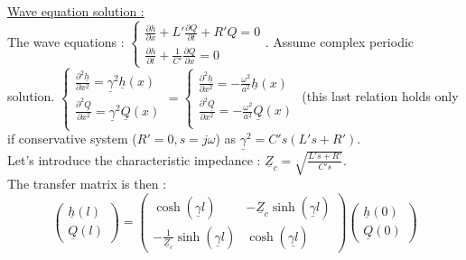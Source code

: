 \documentclass[../main.tex]{subfiles}
\begin{document}
\quad \underline{Wave equation solution :}\\

The wave equations : $\begin{cases}
    \frac{\partial h}{\partial x}+ L' \frac{\partial Q}{\partial t} + R' Q = 0\\ \frac{\partial h}{\partial t} + \frac{1}{C'} \frac{\partial Q}{\partial x} =0
\end{cases}$. Assume complex periodic solution. $\begin{cases}
    \frac{\partial^2\underline{h}}{\partial x^2} = \underline{\gamma}^2 \underline{h}(x)\\
    \frac{\partial^2\underline{Q}}{\partial x^2} = \underline{\gamma}^2 \underline{Q}(x)\\
\end{cases} = \begin{cases}
    \frac{\partial^2\underline{h}}{\partial x^2} = -\frac{\omega^2}{a^2} \underline{h}(x)\\
    \frac{\partial^2\underline{Q}}{\partial x^2} = -\frac{\omega^2}{a^2} \underline{Q}(x)\\
\end{cases}$ (this last relation holds only if conservative system ($R'=0, s=j\omega$) as $\underline{\gamma}^2 = C's(L's+R')$.\\

Let's introduce the characteristic impedance : $\underline{Z}_c = \sqrt{\frac{L's+R'}{C's}}$.\\
The transfer matrix is then : \begin{equation}
    \begin{pmatrix}
        \underline{h}(l)\\ \underline{Q}(l) 
    \end{pmatrix} = \begin{pmatrix}
        \cosh(\underline{\gamma} l) & -\underline{Z}_c \sinh(\underline{\gamma}l)\\
        -\frac{1}{\underline{Z}_c} \sinh(\underline{\gamma}l) & \cosh(\underline{\gamma l})
    \end{pmatrix} \begin{pmatrix}
        \underline{h}(0)\\ \underline{Q}(0)
    \end{pmatrix}
\end{equation}
\end{document}
